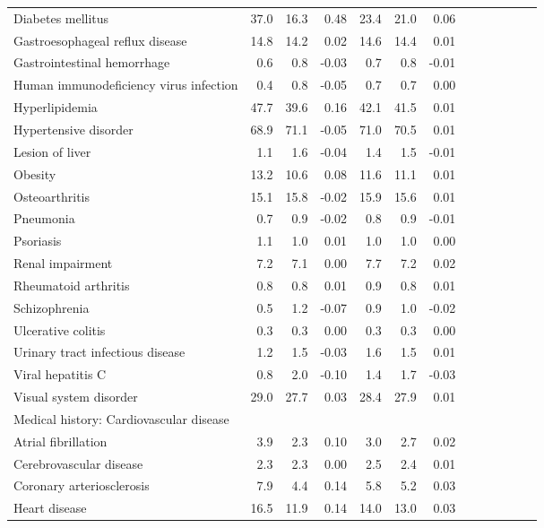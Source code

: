 \documentclass[11pt,]{article}
\begin{document}
\begin{longtable}{lrrrrrrrrrrrr}
      Diabetes mellitus & 37.0 & 16.3 &  0.48 & 23.4 & 21.0 &  0.06 \\ 
      Gastroesophageal reflux disease & 14.8 & 14.2 &  0.02 & 14.6 & 14.4 &  0.01 \\ 
      Gastrointestinal hemorrhage &  0.6 &  0.8 & -0.03 &  0.7 &  0.8 & -0.01 \\ 
      Human immunodeficiency virus infection &  0.4 &  0.8 & -0.05 &  0.7 &  0.7 &  0.00 \\ 
      Hyperlipidemia & 47.7 & 39.6 &  0.16 & 42.1 & 41.5 &  0.01 \\ 
      Hypertensive disorder & 68.9 & 71.1 & -0.05 & 71.0 & 70.5 &  0.01 \\ 
      Lesion of liver &  1.1 &  1.6 & -0.04 &  1.4 &  1.5 & -0.01 \\ 
      Obesity & 13.2 & 10.6 &  0.08 & 11.6 & 11.1 &  0.01 \\ 
      Osteoarthritis & 15.1 & 15.8 & -0.02 & 15.9 & 15.6 &  0.01 \\ 
      Pneumonia &  0.7 &  0.9 & -0.02 &  0.8 &  0.9 & -0.01 \\ 
      Psoriasis &  1.1 &  1.0 &  0.01 &  1.0 &  1.0 &  0.00 \\ 
      Renal impairment &  7.2 &  7.1 &  0.00 &  7.7 &  7.2 &  0.02 \\ 
      Rheumatoid arthritis &  0.8 &  0.8 &  0.01 &  0.9 &  0.8 &  0.01 \\ 
      Schizophrenia &  0.5 &  1.2 & -0.07 &  0.9 &  1.0 & -0.02 \\ 
      Ulcerative colitis &  0.3 &  0.3 &  0.00 &  0.3 &  0.3 &  0.00 \\ 
      Urinary tract infectious disease &  1.2 &  1.5 & -0.03 &  1.6 &  1.5 &  0.01 \\ 
      Viral hepatitis C &  0.8 &  2.0 & -0.10 &  1.4 &  1.7 & -0.03 \\ 
      Visual system disorder & 29.0 & 27.7 &  0.03 & 28.4 & 27.9 &  0.01 \\ 
  Medical history: Cardiovascular disease &    &    &     &    &    &     \\ 
      Atrial fibrillation &  3.9 &  2.3 &  0.10 &  3.0 &  2.7 &  0.02 \\ 
      Cerebrovascular disease &  2.3 &  2.3 &  0.00 &  2.5 &  2.4 &  0.01 \\ 
      Coronary arteriosclerosis &  7.9 &  4.4 &  0.14 &  5.8 &  5.2 &  0.03 \\ 
      Heart disease & 16.5 & 11.9 &  0.14 & 14.0 & 13.0 &  0.03 \\ 

\end{longtable}
\end{document}
